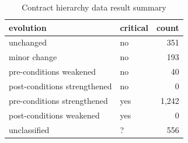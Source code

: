 \begin{table}[]
\centering
\caption{Contract hierarchy data result summary}
\label{tab:results-hierarchy}
\begin{tabular}{|l|l|r|} \hline
   evolution & critical & count \\ \hline
   unchanged & no & 351  \\
   minor change & no & 193  \\
   pre-conditions weakened & no & 40  \\
   post-conditions strengthened & no & 0  \\ \hline
   pre-conditions strengthened & yes & 1,242  \\
   post-conditions weakened & yes & 0  \\ \hline
   unclassified & ? & 556  \\ \hline
\end{tabular}
\end{table}
